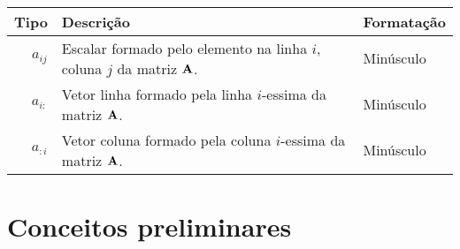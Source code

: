 \begin{notation}~\\
\begin{tabular}{r | p{.6\linewidth} | l}
\hline	
Tipo & Descrição & Formatação \\ \hline
$a_{ij}$ & Escalar formado pelo elemento na linha $i$, coluna $j$ da matriz $\MATRIX{A}$. & Minúsculo \\ \hline
$a_{i:}$ & Vetor linha formado pela linha $i$-essima da matriz $\MATRIX{A}$.  & Minúsculo \\
$a_{:i}$ & Vetor coluna formado pela coluna $i$-essima da matriz $\MATRIX{A}$.  & Minúsculo \\
\end{tabular}
\end{notation}

\section{Conceitos preliminares}

